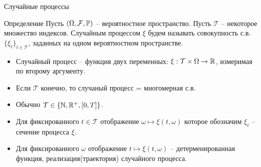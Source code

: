 \documentclass{beamer}
\begin{document}

\begin{frame}{Случайные процессы}
\begin{block}{Определение}
    Пусть $(\Omega, \mathcal{F}, \mathbb{P})$ -- вероятностное пространство. Пусть $\mathcal{T}$ -- некоторое множество индексов. Случайным процессом $\xi$ будем называть совокупность с.в. $\{\xi_t\}_{t\in \mathcal{T}}$, заданных на одном вероятностном пространстве.
\end{block}
\begin{itemize}
    \item Случайный процесс -- функция двух переменных: $\xi : \mathcal{T} \times \Omega \to \mathbb{R}$, измеримая по второму аргументу.
    \item Если $\mathcal{T}$ конечно, то случаный процесс = многомерная с.в.
    \item Обычно $\mathcal{T} \in \{ \mathbb{N}, \mathbb{R}^+, [0, T]\}$.
    \item Для фиксированного $t\in \mathcal{T}$ отображение 
    $\omega \mapsto\xi(t, \omega)$  которое обозначим $\xi_t$ -- сечение процесса $\xi$.
    \item Для фиксированного $\omega$ отображение $t \mapsto \xi(t, \omega)$ -- детерменированная функция, реализация(траектория) случайного процесса.
\end{itemize}
\end{frame}
\end{document}
